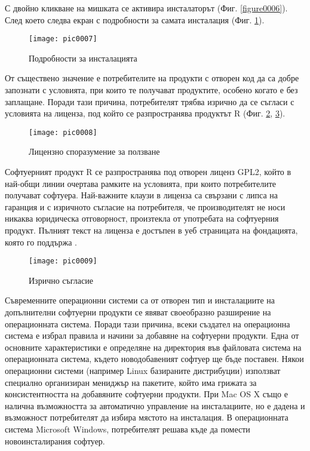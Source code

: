 С двойно кликване на мишката се активира инсталаторът (Фиг. \ref{figure0006}). След което следва екран с подробности за самата инсталация (Фиг. \ref{figure0007}).

\begin{figure}[h]
  \centering
  \texttt{[image: pic0007]}
  \caption{Подробности за инсталацията}
\label{figure0007}
\end{figure}
\FloatBarrier

От съществено значение е потребителите на продукти с отворен код да са добре запознати с условията, при които те получават продуктите, особено когато е без заплащане. Поради тази причина, потребителят трябва изрично да се съгласи с условията на лиценза, под който се разпространява продуктът R (Фиг. \ref{figure0008}, \ref{figure0009}).

\begin{figure}[h]
  \centering
  \texttt{[image: pic0008]}
  \caption{Лицензно споразумение за ползване}
\label{figure0008}
\end{figure}
\FloatBarrier

Софтуерният продукт R се разпространява под отворен лиценз GPL2, който в най-общи линии очертава рамките на условията, при които потребителите получават софтуера. Най-важните клаузи в лиценза са свързани с липса на гаранция и с изричното съгласие на потребителя, че производителят не носи никаква юридическа отговорност, произтекла от употребата на софтуерния продукт. Пълният текст на лиценза е достъпен в уеб страницата на фондацията, която го поддържа \cite{gpl2}.

\begin{figure}[h]
  \centering
  \texttt{[image: pic0009]}
  \caption{Изрично съгласие}
\label{figure0009}
\end{figure}
\FloatBarrier

Съвременните операционни системи са от отворен тип и инсталациите на допълнителни софтуерни продукти се явяват своеобразно разширение на операционната система. Поради тази причина, всеки създател на операционна система е избрал правила и начини за добавяне на софтуерни продукти. Една от основните характеристики е определяне на директория във файловата система на операционната система, където новодобавеният софтуер ще бъде поставен. Някои операционни системи (например Linux базираните дистрибуции) използват специално организиран мениджър на пакетите, който има грижата за консистентността на добавяните софтуерни продукти. При Mac OS X също е налична възможността за автоматично управление на инсталациите, но е дадена и възможност потребителят да избира мястото на инсталация. В операционната система Microsoft Windows, потребителят решава къде да помести новоинсталирания софтуер.

